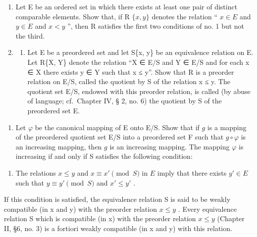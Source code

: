 \begin{enumerate}
\def\labelenumi{\arabic{enumi}.}
\item
  Let E be an ordered set in which there exists at least one pair of distinct comparable elements. Show that, if R \(\{x, y\}\) denotes the relation `` \(x \in E\) and \(y \in E\) and \(x < y\) '', then R satisfies the first two conditions of no. 1 but not the third.
\item
  \begin{enumerate}
  \def\labelenumii{(\alph{enumii})}
  \tightlist
  \item
    Let E be a preordered set and let S\{x, y\} be an equivalence relation on E. Let R\{X, Y\} denote the relation ``X ∈ E/S and Y ∈ E/S and for each x ∈ X there exists y ∈ Y such that x ≤ y''. Show that R is a preorder relation on E/S, called the quotient by S of the relation x ≤ y. The quotient set E/S, endowed with this preorder relation, is called (by abuse of language; cf.~Chapter IV, § 2, no. 6) the quotient by S of the preordered set E.
  \end{enumerate}
\end{enumerate}

\begin{enumerate}
\def\labelenumi{(\alph{enumi})}
\setcounter{enumi}{1}
\tightlist
\item
  Let \(\varphi\) be the canonical mapping of E onto E/S. Show that if \(g\) is a mapping of the preordered quotient set E/S into a preordered set F such that \(g \circ \varphi\) is an increasing mapping, then \(g\) is an increasing mapping. The mapping \(\varphi\) is increasing if and only if S satisfies the following condition:
\end{enumerate}

\begin{enumerate}
\def\labelenumi{(\Alph{enumi})}
\setcounter{enumi}{2}
\tightlist
\item
  The relations \(x \leqslant y\) and \(x \equiv x' \pmod{S}\) in \(E\) imply that there exists \(y' \in E\) such that \(y \equiv y' \pmod{S}\) and \(x' \leqslant y'\) .
\end{enumerate}

If this condition is satisfied, the equivalence relation S is said to be weakly compatible (in x and y) with the preorder relation \(x \leqslant y\) . Every equivalence relation S which is compatible (in x) with the preorder relation \(x \leqslant y\) (Chapter II, §6, no. 3) is a fortiori weakly compatible (in x and y) with this relation.

